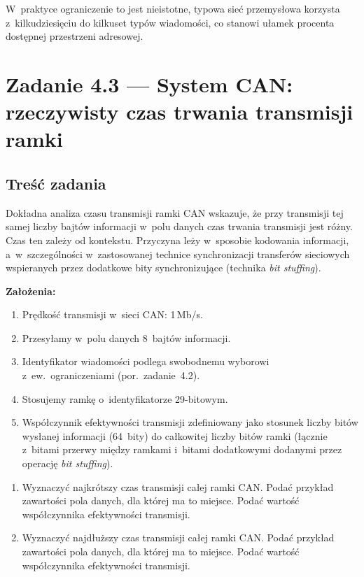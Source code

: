 \documentclass[12pt,a4paper]{article}
\begin{document}
W~praktyce ograniczenie to jest nieistotne, typowa sieć przemysłowa korzysta
z~kilkudziesięciu do kilkuset typów wiadomości, co stanowi ułamek procenta
dostępnej przestrzeni adresowej.

\section*{Zadanie 4.3 — System CAN: rzeczywisty czas trwania transmisji ramki}

\subsection*{Treść zadania}

Dokładna analiza czasu transmisji ramki CAN wskazuje, że przy transmisji tej samej
liczby bajtów informacji w~polu danych czas trwania transmisji jest różny. Czas ten
zależy od kontekstu. Przyczyna leży w~sposobie kodowania informacji, a~w~szczególności
w~zastosowanej technice synchronizacji transferów sieciowych wspieranych przez
dodatkowe bity synchronizujące (technika \textit{bit stuffing}).

\textbf{Założenia:}
\begin{enumerate}[label=\alph*)]
    \item Prędkość transmisji w~sieci CAN: 1\,Mb/s.
    \item Przesyłamy w~polu danych 8~bajtów informacji.
    \item Identyfikator wiadomości podlega swobodnemu wyborowi z~ew.\ ograniczeniami
          (por.\ zadanie~4.2).
    \item Stosujemy ramkę o~identyfikatorze 29-bitowym.
    \item Współczynnik efektywności transmisji zdefiniowany jako stosunek liczby bitów
          wysłanej informacji (64~bity) do całkowitej liczby bitów ramki (łącznie
          z~bitami przerwy między ramkami i~bitami dodatkowymi dodanymi przez operację
          \textit{bit stuffing}).
\end{enumerate}

\begin{enumerate}[label=\alph*)]
    \item Wyznaczyć najkrótszy czas transmisji całej ramki CAN. Podać przykład
          zawartości pola danych, dla której ma to miejsce. Podać wartość współczynnika
          efektywności transmisji.
    \item Wyznaczyć najdłuższy czas transmisji całej ramki CAN. Podać przykład
          zawartości pola danych, dla której ma to miejsce. Podać wartość współczynnika
          efektywności transmisji.
\end{enumerate}
\end{document}
